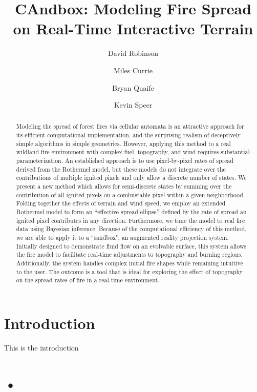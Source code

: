 \documentclass{article}
\author[1, 2]{David Robinson}
\author[1, 2]{Miles Currie}
\author[1, 2]{Bryan Quaife}
\author[1]{Kevin Speer}
\affil[1]{Geophysical Fluid Dynamics Institute}
\affil[2]{FSU Department of Scientific Computing}
\title{CAndbox: Modeling Fire Spread on Real-Time Interactive Terrain}
\date{}
\begin{document}
\maketitle

\begin{abstract}
Modeling the spread of forest fires via cellular automata is an attractive approach for its efficient computational implementation, and the surprising realism of deceptively simple algorithms in simple geometries. However, applying this method to a real wildland fire environment with complex fuel, topography, and wind requires substantial parameterization. An established approach is to use pixel-by-pixel rates of spread derived from the Rothermel model, but these models do not integrate over the contributions of multiple ignited pixels and only allow a discrete number of states. We present a new method which allows for semi-discrete states by summing over the contribution of all ignited pixels on a combustable pixel within a given neighborhood. Folding together the effects of terrain and wind speed, we employ an extended Rothermel model to form an ``effective spread ellipse'' defined by the rate of spread an ignited pixel contributes in any direction. Furthermore, we tune the model to real fire data using Bayesian inference. Because of the computational efficiency of this method, we are able to apply it to a “sandbox", an augmented reality projection system. Initially designed to demonstrate fluid flow on an evolvable surface, this system allows the fire model to facilitate real-time adjustments to topography and burning regions. Additionally, the system handles complex initial fire shapes while remaining intuitive to the user. The outcome is a tool that is ideal for exploring the effect of topography on the spread rates of fire in a real-time environment.

\end{abstract}


\section{Introduction}
This is the introduction

\section{•}
\end{document}
